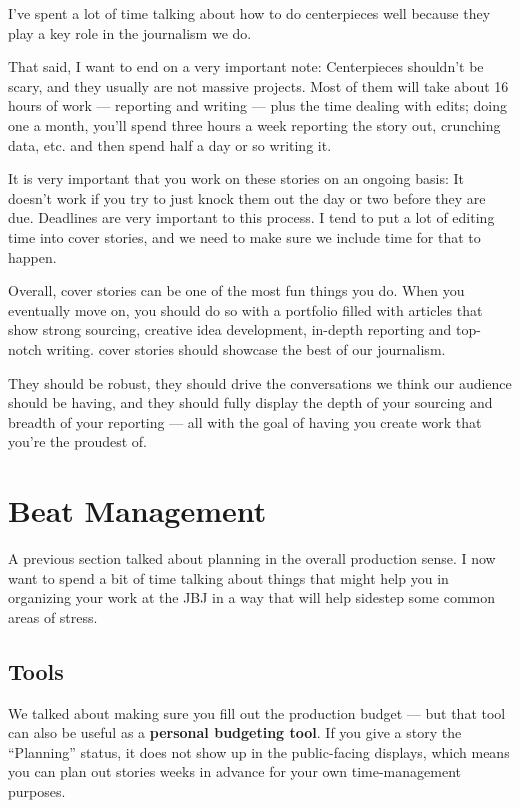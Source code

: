 \documentclass[
  11pt,
  american,
  letterpaperpaper,
  extrafontsizes,onecolumn,openright
  ]{memoir}
\begin{document}
I've spent a lot of time talking about how to do centerpieces well because they play a key role in the journalism we do.

That said, I want to end on a very important note: Centerpieces shouldn't be scary, and they usually are not massive projects. Most of them will take about 16 hours of work --- reporting and writing --- plus the time dealing with edits; doing one a month, you'll spend three hours a week reporting the story out, crunching data, etc. and then spend half a day or so writing it.

It is very important that you work on these stories on an ongoing basis: It doesn't work if you try to just knock them out the day or two before they are due. Deadlines are very important to this process. I tend to put a lot of editing time into cover stories, and we need to make sure we include time for that to happen.

Overall, cover stories can be one of the most fun things you do. When you eventually move on, you should do so with a portfolio filled with articles that show strong sourcing, creative idea development, in-depth reporting and top-notch writing. cover stories should showcase the best of our journalism.

They should be robust, they should drive the conversations we think our audience should be having, and they should fully display the depth of your sourcing and breadth of your reporting --- all with the goal of having you create work that you're the proudest of.

\hypertarget{beat-management}{%
\chapter{Beat Management}\label{beat-management}}

A previous section talked about planning in the overall production sense. I now want to spend a bit of time talking about things that might help you in organizing your work at the JBJ in a way that will help sidestep some common areas of stress.

\hypertarget{tools}{%
\section*{Tools}\label{tools}}

We talked about making sure you fill out the production budget --- but that tool can also be useful as a \textbf{personal budgeting tool}. If you give a story the \enquote{Planning} status, it does not show up in the public-facing displays, which means you can plan out stories weeks in advance for your own time-management purposes.
\end{document}
